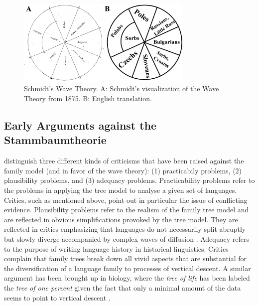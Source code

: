 \documentclass[svgnames,12pt]{scrartcl}
\begin{document}
{\begin{figure}[htb]
\centering
\includegraphics[width=0.75\textwidth]{images/schmidt-1875.pdf}
\caption{Schmidt's Wave Theory. A: Schmidt's visualization of the Wave Theory from 1875. B: English
translation.}
\label{fig:schmidt1875}
\end{figure}

\subsection{Early Arguments against the Stammbaumtheorie}

\citet[118-120]{Geisler2013} distinguish three different kinds of
criticisms that have been raised against the family model (and in favor of the wave theory): (1)
practicabily problems, (2) plausibility problems, and (3) adequacy problems. Practicability
problems refer to the problems in applying the tree model to analyse a given set of languages. 
Critics, such as \citet{Schmidt1872} mentioned above, point out in particular the issue of
conflicting evidence.
Plausibility problems refer to the realism of the family tree model and
are reflected in obvious simplifications provoked by the tree model. They are reflected in critics
emphasizing that languages do not necessarily split abruptly but slowly diverge accompanied by
complex waves of diffusion \citep{Schuchardt1870,Schmidt1872}. Adequacy refers to the purpose of
writing language history in historical linguistics. Critics complain that family trees break down
all vivid aspects that are substantial for the diversification of a language family to processes of
vertical descent. A similar argument has been brought up in biology, where the \emph{tree of life}
has been labeled the \emph{tree of one percent} given the fact that only a minimal amount of the
data seems to point to vertical descent \citep{Dagan2006}.
 
}
\end{document}
